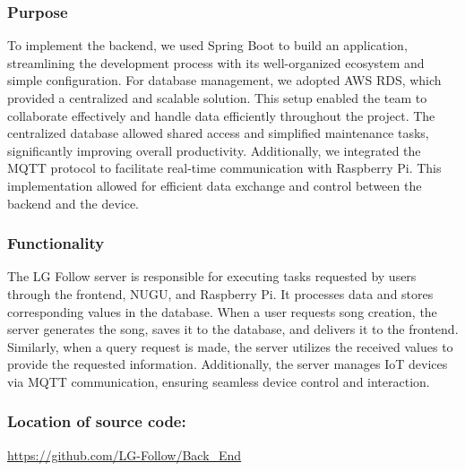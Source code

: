\documentclass[conference]{IEEEtran}
\begin{document}
\subsubsection{Purpose}
\noindent To implement the backend, we used Spring Boot to build an application, streamlining the development process with its well-organized ecosystem and simple configuration. For database management, we adopted AWS RDS, which provided a centralized and scalable solution. This setup enabled the team to collaborate effectively and handle data efficiently throughout the project. The centralized database allowed shared access and simplified maintenance tasks, significantly improving overall productivity. Additionally, we integrated the MQTT protocol to facilitate real-time communication with Raspberry Pi. This implementation allowed for efficient data exchange and control between the backend and the device.\\

\subsubsection{Functionality}
\noindent The LG Follow server is responsible for executing tasks requested by users through the frontend, NUGU, and Raspberry Pi. It processes data and stores corresponding values in the database. When a user requests song creation, the server generates the song, saves it to the database, and delivers it to the frontend. Similarly, when a query request is made, the server utilizes the received values to provide the requested information. Additionally, the server manages IoT devices via MQTT communication, ensuring seamless device control and interaction.\\

\subsubsection{Location of source code: }
\url{https://github.com/LG-Follow/Back_End}\\

\clearpage
\end{document}
